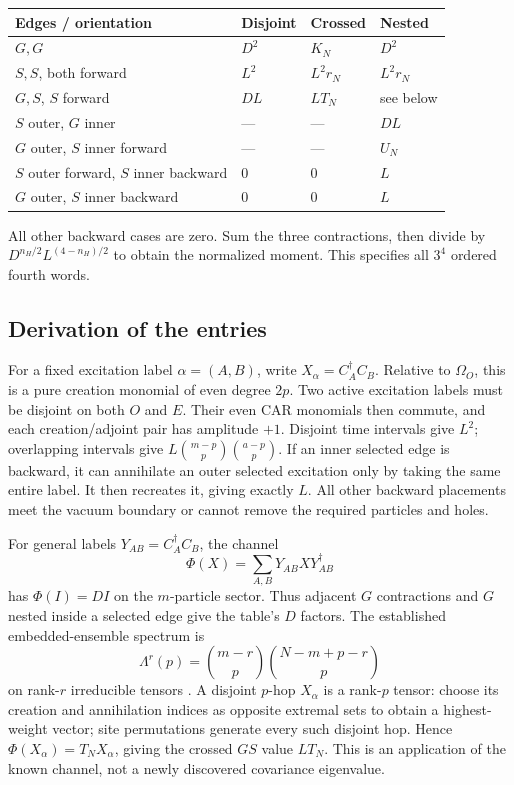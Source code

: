 \documentclass[11pt]{article}
\newcommand{\Om}{\Omega_O}
\newcommand{\bn}[2]{\binom{#1}{#2}}
\begin{document}
\newpage
\begin{center}
\begin{tabular}{llll}
\toprule
Edges / orientation & Disjoint & Crossed & Nested\\
\midrule
$G,G$ & $D^2$ & $K_N$ & $D^2$\\
$S,S$, both forward & $L^2$ & $L^2r_N$ & $L^2r_N$\\
$G,S$, $S$ forward & $DL$ & $LT_N$ & see below\\
$S$ outer, $G$ inner & --- & --- & $DL$\\
$G$ outer, $S$ inner forward & --- & --- & $U_N$\\
$S$ outer forward, $S$ inner backward & $0$ & $0$ & $L$\\
$G$ outer, $S$ inner backward & $0$ & $0$ & $L$\\
\bottomrule
\end{tabular}
\end{center}
All other backward cases are zero. Sum the three contractions,
then divide by $D^{n_H/2}L^{(4-n_H)/2}$ to obtain the normalized
moment. This specifies all $3^4$ ordered fourth words.

\subsection*{Derivation of the entries}
For a fixed excitation label $\alpha=(A,B)$, write
$X_\alpha=C_A^\dagger C_B$. Relative to $\Om$, this is a pure
creation monomial of even degree $2p$. Two active excitation labels
must be disjoint on both $O$ and $E$. Their even CAR monomials then
commute, and each creation/adjoint pair has amplitude $+1$.
Disjoint time intervals give $L^2$; overlapping intervals give
$L\bn{m-p}p\bn{a-p}p$. If an inner selected edge is backward,
it can annihilate an outer selected excitation only by taking the
same entire label. It then recreates it, giving exactly $L$.
All other backward placements meet the vacuum boundary or cannot
remove the required particles and holes.

For general labels $Y_{AB}=C_A^\dagger C_B$, the channel
\begin{equation}\label{channel}
 \Phi(X)=\sum_{A,B}Y_{AB}X Y_{AB}^\dagger
\end{equation}
has $\Phi(I)=DI$ on the $m$-particle sector. Thus adjacent $G$
contractions and $G$ nested inside a selected edge give the table's
$D$ factors. The established embedded-ensemble spectrum is
\begin{equation}\label{eigen}
 \Lambda^r(p)=\bn{m-r}p\bn{N-m+p-r}p
\end{equation}
on rank-$r$ irreducible tensors \cite[Eqs.~(17),(25)--(26)]{Kota}.
A disjoint $p$-hop $X_\alpha$ is a rank-$p$ tensor: choose its
creation and annihilation indices as opposite extremal sets to
obtain a highest-weight vector; site permutations generate every
such disjoint hop. Hence $\Phi(X_\alpha)=T_NX_\alpha$, giving
the crossed $GS$ value $LT_N$. This is an application of the
known channel, not a newly discovered covariance eigenvalue.
\end{document}
